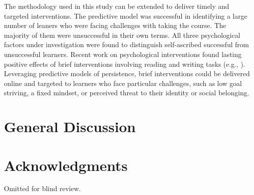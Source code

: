 \documentclass{sigchi}\usepackage[]{graphicx}\usepackage[]{color}
\begin{document}
The methodology used in this study can be extended to deliver timely and targeted interventions. The predictive model was successful in identifying a large number of leaners who were facing challenges with taking the course. The majority of them were unsuccessful in their own terms. All three psychological factors under investigation were found to distinguish self-ascribed successful from unsuccessful learners. Recent work on psychological interventions found lasting positive effects of brief interventions involving reading and writing tasks (e.g., \cite{walton2007question}).  Leveraging predictive models of persistence, brief interventions could be delivered online and targeted to learners who face particular challenges, such as low goal striving, a fixed mindset, or perceived threat to their identity or social belonging. 
 
\section{General Discussion}



\section{Acknowledgments}
Omitted for blind review.


\end{document}
